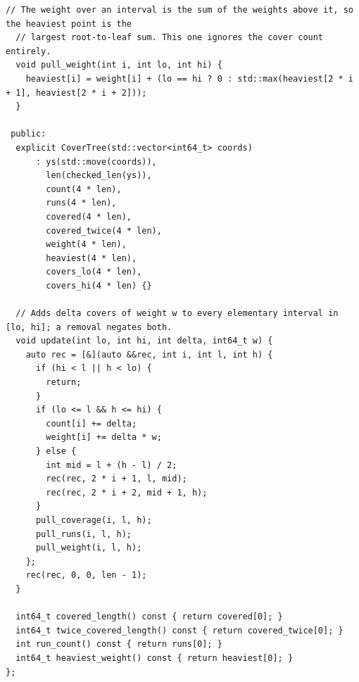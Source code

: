 \begin{lstlisting}[style=cpp]
  // The weight over an interval is the sum of the weights above it, so the heaviest point is the
  // largest root-to-leaf sum. This one ignores the cover count entirely.
  void pull_weight(int i, int lo, int hi) {
    heaviest[i] = weight[i] + (lo == hi ? 0 : std::max(heaviest[2 * i + 1], heaviest[2 * i + 2]));
  }

 public:
  explicit CoverTree(std::vector<int64_t> coords)
      : ys(std::move(coords)),
        len(checked_len(ys)),
        count(4 * len),
        runs(4 * len),
        covered(4 * len),
        covered_twice(4 * len),
        weight(4 * len),
        heaviest(4 * len),
        covers_lo(4 * len),
        covers_hi(4 * len) {}

  // Adds delta covers of weight w to every elementary interval in [lo, hi]; a removal negates both.
  void update(int lo, int hi, int delta, int64_t w) {
    auto rec = [&](auto &&rec, int i, int l, int h) {
      if (hi < l || h < lo) {
        return;
      }
      if (lo <= l && h <= hi) {
        count[i] += delta;
        weight[i] += delta * w;
      } else {
        int mid = l + (h - l) / 2;
        rec(rec, 2 * i + 1, l, mid);
        rec(rec, 2 * i + 2, mid + 1, h);
      }
      pull_coverage(i, l, h);
      pull_runs(i, l, h);
      pull_weight(i, l, h);
    };
    rec(rec, 0, 0, len - 1);
  }

  int64_t covered_length() const { return covered[0]; }
  int64_t twice_covered_length() const { return covered_twice[0]; }
  int run_count() const { return runs[0]; }
  int64_t heaviest_weight() const { return heaviest[0]; }
};


\end{lstlisting}
